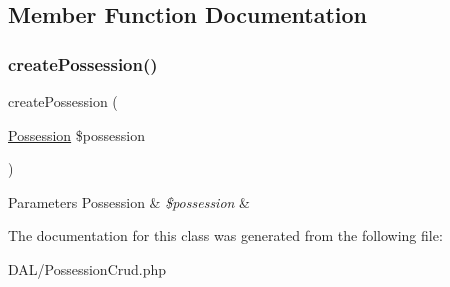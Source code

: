 \subsection{Member Function Documentation}
\mbox{\label{class_app_1_1_d_a_l_1_1_possession_crud_aa2e3ba64b213833917fd22ec423de8eb}} 
\subsubsection{\texorpdfstring{createPossession()}{createPossession()}}
{\footnotesize\ttfamily create\+Possession (\begin{DoxyParamCaption}\item[{\mbox{\hyperlink{class_app_1_1_entity_1_1_possession}{Possession}}}]{\$possession }\end{DoxyParamCaption})}


\begin{DoxyParams}[1]{Parameters}
Possession & {\em \$possession} & \\
\hline
\end{DoxyParams}


The documentation for this class was generated from the following file\+:\begin{DoxyCompactItemize}
\item 
D\+A\+L/Possession\+Crud.\+php\end{DoxyCompactItemize}
